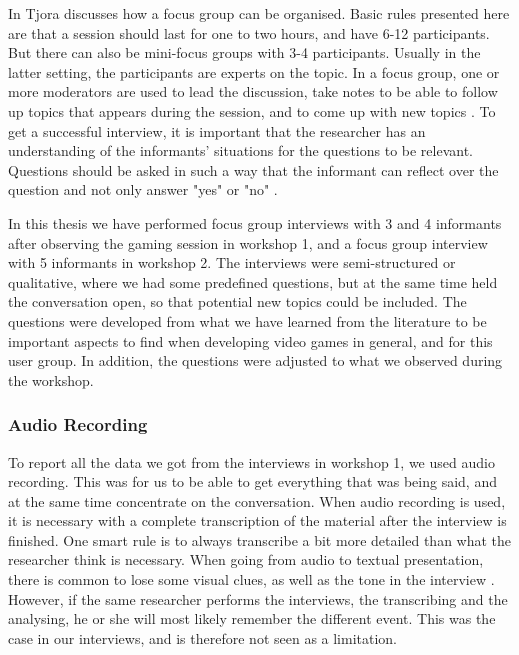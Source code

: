 In \cite{tjora} Tjora discusses how a focus group can be organised. Basic rules presented here are that a session should last for one to two hours, and have 6-12 participants. But there can also be mini-focus groups with 3-4 participants. Usually in the latter setting, the participants are experts on the topic. In a focus group, one or more moderators are used to lead the discussion, take notes to be able to follow up topics that appears during the session, and to come up with new topics \cite{tjora}. To get a successful interview, it is important that the researcher has an understanding of the informants’ situations for the questions to be relevant. Questions should be asked in such a way that the informant can reflect over the question and not only answer "yes" or "no" \cite{qualitative}.

In this thesis we have performed focus group interviews with 3 and 4 informants after observing the gaming session in workshop 1, and a focus group interview with 5 informants in workshop 2. The interviews were semi-structured or qualitative, where we had some predefined questions, but at the same time held the conversation open, so that potential new topics could be included. The questions were developed from what we have learned from the literature to be important aspects to find when developing video games in general, and for this user group. In addition, the questions were adjusted to what we observed during the workshop. 

\subsubsection{Audio Recording}
To report all the data we got from the interviews in workshop 1, we used audio recording. This was for us to be able to get everything that was being said, and at the same time concentrate on the conversation. When audio recording is used, it is necessary with a complete transcription of the material after the interview is finished. One smart rule is to always transcribe a bit more detailed than what the researcher think is necessary. When going from audio to textual presentation, there is common to lose some visual clues, as well as the tone in the interview \cite{tjora}. However, if the same researcher performs the interviews, the transcribing and the analysing, he or she will most likely remember the different event. This was the case in our interviews, and is therefore not seen as a limitation. 

